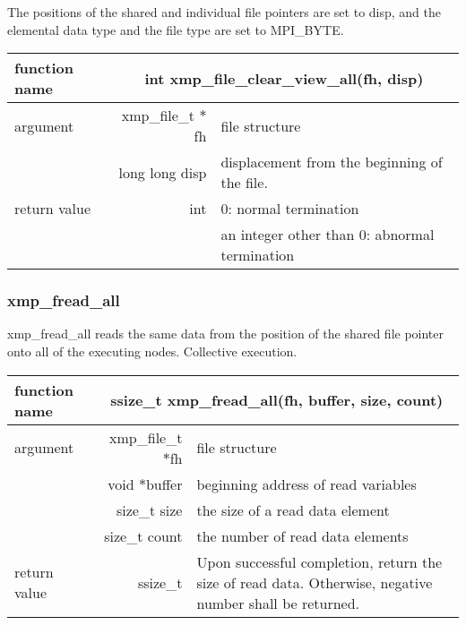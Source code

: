    The positions of the shared and individual file pointers are set to
   disp, and 
   the elemental data type and the file type are set to MPI\_BYTE.
   
   \begin{table}[h]
    \begin{center}
     \begin{tabular}{|l|r|p{80mm}|}
      \hline
      {\bf function name}  & \multicolumn{2}{c|}{\bf int xmp\_file\_clear\_view\_all(fh,
      disp)} \\ \hline \hline
      argument & xmp\_file\_t $*$fh & file structure \\ \cline{2-3}
      & long long disp & displacement from the beginning of the file. \\ \hline
      return value & int & 0: normal termination \\
      &  & an integer other than 0: abnormal termination \\ \hline
      \end{tabular}
     \end{center}
   \end{table}

   \subsubsection{xmp\_fread\_all}
   xmp\_fread\_all reads the same data from the position of the shared file
   pointer onto all of the executing nodes. Collective execution.

   \begin{table}[h]
    \begin{center}
     \begin{tabular}{|l|r|p{80mm}|}
      \hline
      {\bf function name}  & \multicolumn{2}{c|}{\bf ssize\_t
      xmp\_fread\_all(fh, buffer, size, count)}  \\ \hline \hline
      argument & xmp\_file\_t $*$fh & file structure \\ \cline{2-3}
      & void $*$buffer & beginning address of read variables \\ \cline{2-3}
      & size\_t size & the size of a read data element \\ \cline{2-3}
      & size\_t count & the number of read data elements \\ \hline
      return value & ssize\_t & Upon successful completion, return the size
	      of read data. Otherwise, negative number shall be
	      returned. \\ \hline
      \end{tabular}
     \end{center}
   \end{table}

